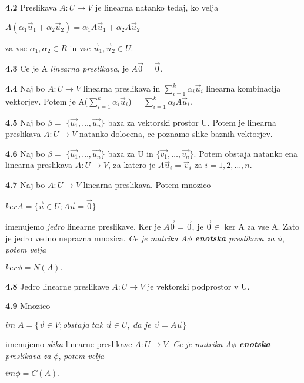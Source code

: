 \documentclass{article}
\begin{document}
\begin{multicols}{4}
\textbf{4.2} Preslikava $A: U \rightarrow V$ je linearna natanko tedaj, ko velja
\begin{center}
    $A(\alpha_{1}\vec{u}_{1} + \alpha_{2}\vec{u}_{2}) = \alpha_{1}A\vec{u}_{1} + \alpha_{2}A\vec{u}_{2}$
\end{center}
za vse $\alpha_{1}, \alpha_{2} \in R$ in vse $\vec{u}_{1}, \vec{u}_{2} \in U$.

\textbf{4.3} Ce je A \textit{linearna preslikava}, je $A\vec{0} = \vec{0}$.

\textbf{4.4} Naj bo $A: U \rightarrow V$ linearna preslikava in $\sum_{i=1}^{k} \alpha_{i}\vec{u}_{i}$
linearna kombinacija vektorjev. Potem je A($\sum_{i=1}^{k} \alpha_{i}\vec{u}_{i}$) = $\sum_{i=1}^{k} \alpha_{i}A\vec{u}_{i}$.

\textbf{4.5} Naj bo $\beta =$ $\{ \vec{u_{1}}, \dots,\vec{u_{n}}\}$ baza za vektorski prostor U. Potem je linearna
preslikava $A: U \rightarrow V$ natanko dolocena, ce poznamo slike baznih vektorjev.

\textbf{4.6} Naj bo $\beta =$ $\{\vec{u_{1}}, \dots,\vec{u_{n}}\}$ baza za U in $\{\vec{v_{1}}, \dots,\vec{v_{n}}\}$.
Potem obstaja natanko ena linearna preslikava $A: U \rightarrow V$, za katero je $A\vec{u}_{i} = \vec{v}_{i}$ za $i = 1, 2, \dots, n$.

\textbf{4.7} Naj bo $A: U \rightarrow V$ linearna preslikava. Potem mnozico
\begin{center}
    $ker A = \{ \vec{u} \in U; A\vec{u} = \vec{0}\}$
\end{center}
imenujemo \textit{jedro} linearne preslikave. Ker je $A\vec{0} = \vec{0}$, je $\vec{0} \in$ ker A za vse A.
Zato je jedro vedno neprazna mnozica.
\textit{Ce je matrika A$\phi$ \textbf{enotska} preslikava za } $\phi$, \textit{potem velja}
\begin{center}
    \begin{math}
        ker \phi = N(A).
    \end{math}
\end{center}

\textbf{4.8} Jedro linearne preslikave $A: U \rightarrow V$ je vektorski podprostor v U.

\textbf{4.9} Mnozico
\begin{center}
    $im\; A = \{ \vec{v} \in V; obstaja\; tak\; \vec{u} \in U,\; da\; je\; \vec{v} = A\vec{u} \}$
\end{center}
imenujemo \textit{slika} linearne preslikave $A: U \rightarrow V$.
\textit{Ce je matrika A$\phi$ \textbf{enotska} preslikava za } $\phi$, \textit{potem velja}
\begin{center}
    \begin{math}
        im \phi = C(A).
    \end{math}
\end{center}


\end{multicols}
\end{document}
